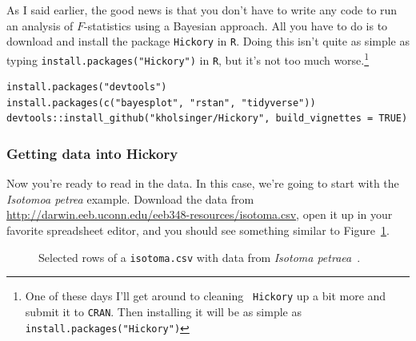 \documentclass[12pt]{article}
\begin{document}
As I said earlier, the good news is that you don't have to write any
code to run an analysis of $F$-statistics using a Bayesian
approach. All you have to do is to download and install the package
{\tt Hickory} in {\tt R}. Doing this isn't quite as simple as typing
{\tt install.packages("Hickory")} in {\tt R}, but it's not too much
worse.\footnote{One of these days I'll get around to cleaning {\tt
    Hickory} up a bit more and submit it to {\tt CRAN}. Then
  installing it will be as simple as {\tt
    install.packages("Hickory")}} 

\begin{verbatim}
install.packages("devtools")
install.packages(c("bayesplot", "rstan", "tidyverse"))
devtools::install_github("kholsinger/Hickory", build_vignettes = TRUE)
\end{verbatim}

\subsubsection*{Getting data into Hickory}

Now you're ready to read in the data. In this case, we're going to
start with the {\it Isotomoa petrea\/} example. Download the data from
\url{http://darwin.eeb.uconn.edu/eeb348-resources/isotoma.csv}, open
it up in your favorite spreadsheet editor, and you should see
something similar to Figure~\ref{fig:isotoma-csv}.

\begin{figure}
  \begin{center}
  \end{center}
\caption{Selected rows of a {\tt isotoma.csv} with data from {\it
    Isotoma petraea}~\cite{James-etal-1983}.}\label{fig:isotoma-csv}
\end{figure}
\end{document}
